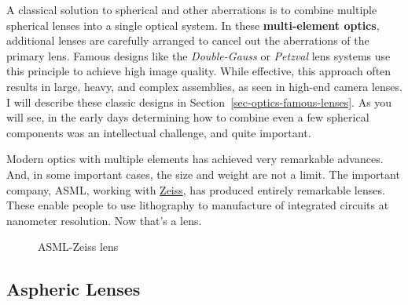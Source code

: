 \documentclass[
  letterpaper,
]{book}
\begin{document}
A classical solution to spherical and other aberrations is to combine
multiple spherical lenses into a single optical system. In these
\textbf{multi-element optics}, additional lenses are carefully arranged
to cancel out the aberrations of the primary lens. Famous designs like
the \emph{Double-Gauss} or \emph{Petzval} lens systems use this
principle to achieve high image quality. While effective, this approach
often results in large, heavy, and complex assemblies, as seen in
high-end camera lenses. I will describe these classic designs in
Section~\ref{sec-optics-famous-lenses}. As you will see, in the early
days determining how to combine even a few spherical components was an
intellectual challenge, and quite important.

Modern optics with multiple elements has achieved very remarkable
advances. And, in some important cases, the size and weight are not a
limit. The important company, ASML, working with
\href{https://www.zeiss.com/semiconductor-manufacturing-technology/smt-magazine/duv-lithography.html}{Zeiss},
has produced entirely remarkable lenses. These enable people to use
lithography to manufacture of integrated circuits at nanometer
resolution. Now that's a lens.

\begin{figure}


\caption{\label{fig-zeiss-lithography}ASML-Zeiss lens}

\end{figure}%

\subsection{Aspheric Lenses}\label{aspheric-lenses}
\end{document}
